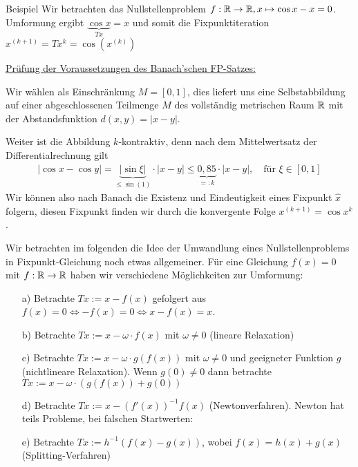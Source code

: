 \begin{colbox}{Beispiel} 
  Wir betrachten das Nullstellenproblem $f:\mathbb R\rightarrow\mathbb R, x\mapsto \cos x - x = 0$. \\
  Umformung ergibt $\underbrace{\cos x}_{Tx} = x$ und somit die Fixpunktiteration $x^{(k+1)}=Tx^k=\cos(x^{(k)})$ \\
  
  \begin{center}
    
  \end{center}
  
  \underline{Prüfung der Voraussetzungen des Banach'schen FP-Satzes:}

  Wir wählen als Einschränkung $M=[0,1]$, dies liefert uns eine Selbstabbildung auf einer abgeschlossenen 
  Teilmenge $M$ des vollständig metrischen Raum $\mathbb R$ mit der Abstandsfunktion $ d(x,y) = |x-y|$. 

  Weiter ist die Abbildung $k$-kontraktiv, denn nach dem Mittelwertsatz der Differentialrechnung gilt 
  \begin{align*}
    |\cos x - \cos y| 
    = \underbrace{|\sin \xi|}_{\leq \sin(1)}\cdot|x-y|
    \leq \underbrace{0,85}_{=:k}\cdot |x-y|, 
    \quad \text{für } \xi\in[0,1]
  \end{align*}
  Wir können also nach Banach die Existenz und Eindeutigkeit eines Fixpunkt $\hat{x}$ folgern, diesen Fixpunkt 
  finden wir durch die konvergente Folge $x^{(k+1)}=\cos x^k$. 
\end{colbox}

Wir betrachten im folgenden die Idee der Umwandlung eines Nullstellenproblems in Fixpunkt-Gleichung noch etwas 
allgemeiner. Für eine Gleichung $f(x)=0$ mit $f:\mathbb R\rightarrow\mathbb R$ haben wir verschiedene Möglichkeiten 
zur Umformung:

\begin{enumerate}
  \item[a)] Betrachte $Tx := x-f(x)$ gefolgert aus $f(x)=0\Leftrightarrow -f(x)=0 \Leftrightarrow x-f(x)=x$.
  \item[b)] Betrachte $Tx := x-\omega \cdot f(x)$ mit $\omega\neq 0$ (lineare Relaxation)
  \item[c)] Betrachte $Tx:=x-\omega \cdot g(f(x))$ mit $\omega \neq 0$ und geeigneter Funktion $g$ 
  (nichtlineare Relaxation). Wenn $g(0)\neq 0$ dann betrachte $Tx:=x-\omega\cdot(g(f(x))+g(0))$
  \item[d)] Betrachte $Tx:=x-(f'(x))^{-1} f(x)$ (Newtonverfahren).
  Newton hat teils Probleme, bei falschen Startwerten: 

  \begin{center}
    
  \end{center}

  \item[e)] Betrachte $Tx:=h^{-1}(f(x)-g(x))$, wobei $f(x)=h(x)+g(x)$ (Splitting-Verfahren) 
\end{enumerate}